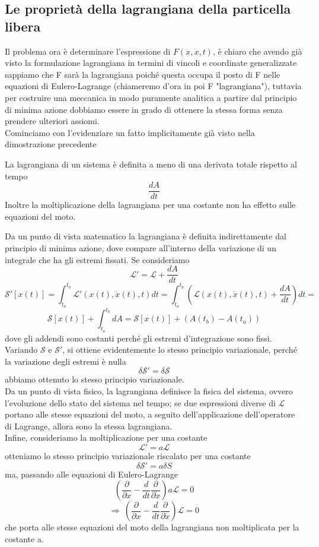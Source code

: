 \documentclass[
10pt, %
a4paper, %
oneside, %
headinclude,footinclude, %
BCOR5mm, %
]{scrartcl}
\begin{document}
\subsection{Le proprietà della lagrangiana della particella libera}
Il problema ora è determinare l'espressione di \(F(x, \dot{x}, t) \), è chiaro che avendo già visto la formulazione lagrangiana in termini di vincoli e coordinate generalizzate sappiamo che F sarà la lagrangiana poiché questa occupa il posto di F nelle equazioni di Eulero-Lagrange (chiameremo d'ora in poi F "lagrangiana"), tuttavia per costruire una meccanica in modo puramente analitica a partire dal principio di minima azione dobbiamo essere in grado di ottenere la stessa forma senza prendere ulteriori assiomi.\\
Cominciamo con l'evidenziare un fatto implicitamente già visto nella dimostrazione precedente
\begin{teorema}
	La lagrangiana di un sistema è definita a meno di una derivata totale rispetto al tempo
			\[\frac{dA}{dt}\]
		Inoltre la moltiplicazione della lagrangiana per una costante non ha effetto sulle equazioni del moto. 
\end{teorema}
\begin{dimostrazione}
	Da un punto di vista matematico la lagrangiana è definita indirettamente dal principio di minima azione, dove compare all'interno della variazione di un integrale che ha gli estremi fissati. Se consideriamo 
	\[\mathcal{L}' = \mathcal{L}+\frac{dA}{dt}\]
	\[\mathcal{S}'[x(t)]=\int_{t_a}^{t_b}\mathcal{L'}(x(t), \dot{x}(t), t)dt = \int_{t_a}^{t_b}\left(\mathcal{L}(x(t), \dot{x}(t), t)+\frac{dA}{dt}\right)dt=\]
	\[\mathcal{S}[x(t)]+\int_{t_a}^{t_b}dA= \mathcal{S}[x(t)]+\left(A(t_b)-A(t_a)\right)\]
	dove gli addendi sono costanti perché gli estremi d'integrazione sono fissi. Variando $\mathcal{S}$ e $\mathcal{S'}$, si ottiene evidentemente lo stesso principio variazionale, perché la variazione degli estremi è nulla
	\[\delta\mathcal{S}'=\delta \mathcal{S}\]
	abbiamo ottenuto lo stesso principio variazionale.\\
	Da un punto di vista fisico, la lagrangiana definisce la fisica del sistema, ovvero l'evoluzione dello stato del sistema nel tempo; se due espressioni diverse di $\mathcal{L}$ portano alle stesse equazioni del moto, a seguito dell'applicazione dell'operatore di Lagrange, allora sono la stessa lagrangiana.\\
	Infine, consideriamo la moltiplicazione per una costante
	\[\mathcal{L}' = a\mathcal{L}\]
	otteniamo lo stesso principio variazionale riscalato per una costante
	\[\delta\mathcal{S}'=a\delta S\]
	ma, passando alle equazioni di Eulero-Lagrange
	\[\left(\frac{\partial}{\partial x}- \frac{d}{dt}\frac{\partial}{\partial \dot{x}}\right)a\mathcal{L} = 0\]
	\[\Rightarrow\ \left(\frac{\partial}{\partial x}- \frac{d}{dt}\frac{\partial}{\partial \dot{x}}\right)\mathcal{L}= 0\]
	che porta alle stesse equazioni del moto della lagrangiana non moltiplicata per la costante a.
\end{dimostrazione}
\end{document}
